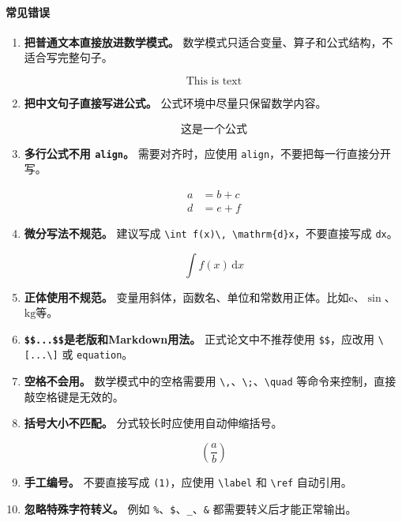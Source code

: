 \paragraph{常见错误}
\begin{enumerate}
    \item \textbf{把普通文本直接放进数学模式。} 数学模式只适合变量、算子和公式结构，不适合写完整句子。

    \[
    \text{This is text}
    \]

    \item \textbf{把中文句子直接写进公式。} 公式环境中尽量只保留数学内容。

    \[
    \text{这是一个公式}
    \]

    \item \textbf{多行公式不用 \texttt{align}。} 需要对齐时，应使用 \texttt{align}，不要把每一行直接分开写。

    \begin{align}
    a &= b + c \\
    d &= e + f
    \end{align}

    \item \textbf{微分写法不规范。} 建议写成 \texttt{\textbackslash int f(x)\textbackslash, \textbackslash mathrm\{d\}x}，不要直接写成 \texttt{dx}。

    \[
    \int f(x)\,\mathrm{d}x
    \]
    \item \textbf{正体使用不规范。} 变量用斜体，函数名、单位和常数用正体。比如$\mathrm{e}$、$\sin$、$\mathrm{kg}$等。
    \item \textbf{ \texttt{\$\$...\$\$}是老版和Markdown用法。} 正式论文中不推荐使用 \texttt{\$\$}，应改用 \texttt{\textbackslash[...\textbackslash]} 或 \texttt{equation}。
    \item \textbf{空格不会用。} 数学模式中的空格需要用 \texttt{\textbackslash,}、\texttt{\textbackslash;}、\texttt{\textbackslash quad} 等命令来控制，直接敲空格键是无效的。

    \item \textbf{括号大小不匹配。} 分式较长时应使用自动伸缩括号。

    \[
    \left( \frac{a}{b} \right)
    \]

    \item \textbf{手工编号。} 不要直接写成 \texttt{(1)}，应使用 \texttt{\textbackslash label} 和 \texttt{\textbackslash ref} 自动引用。

    \item \textbf{忽略特殊字符转义。} 例如 \texttt{\%}、\texttt{\$}、\texttt{\_}、\texttt{\&} 都需要转义后才能正常输出。

\end{enumerate}

